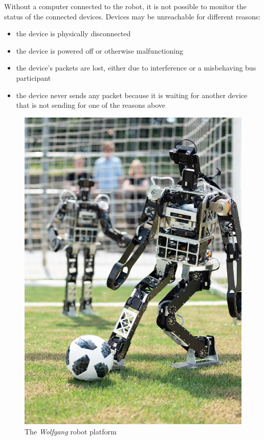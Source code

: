 Without a computer connected to the robot, it is not possible to monitor the status of the connected
devices. Devices may be unreachable for different reasons:

\begin{itemize}
    \item the device is physically disconnected
    \item the device is powered off or otherwise malfunctioning
    \item the device's packets are lost, either due to interference or a misbehaving bus participant
    \item the device never sends any packet because it is waiting for another device that is not sending
          for one of the reasons above
\end{itemize}

\begin{figure}[h]
    \centering
    \includegraphics[scale=0.75]{img/wolfgang.jpg}
    \caption{The \textit{Wolfgang} robot platform}
\end{figure}

